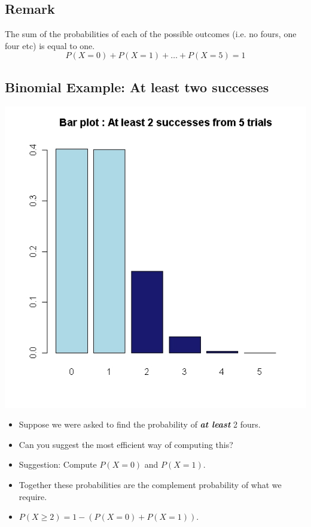 \documentclass[a4paper,12pt]{article}
\begin{document}
\subsection*{Remark}  The sum of the probabilities of each of the possible outcomes (i.e. no fours, one four etc) is equal to one.
\[P(X=0) + P(X = 1) + \ldots + P(X=5) = 1 \]


\subsection*{Binomial Example: At least two successes}

\begin{center}
\includegraphics[scale=0.40]{images/3Bbarplot5}
\end{center}


\begin{itemize}
\item Suppose we were asked to find the probability of \textbf{\emph{at least}} 2 fours.
\item Can you suggest the most efficient way of computing this?
\item Suggestion: Compute $P(X=0)$ and $P(X = 1)$.
\item Together these probabilities are the complement probability of what we require.
\item $P(X \geq 2) = 1 - ( P(X=0) + P(X = 1))$.
\end{itemize}
\newpage
\end{document}
